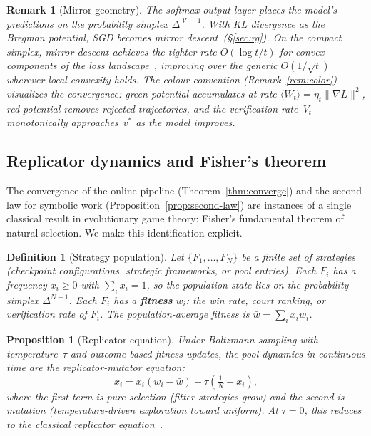 \documentclass[11pt,a4paper]{article}
\newtheorem{proposition}[theorem]{Proposition}
\newtheorem{definition}[theorem]{Definition}
\newtheorem{remark}[theorem]{Remark}
\newcommand{\cV}{\mathcal{V}}
\begin{document}
\begin{remark}[Mirror geometry]\label{rem:mirror-converge}
The softmax output layer places the model's predictions on the
probability simplex $\Delta^{|\cV|-1}$.
With KL divergence as the Bregman potential,
SGD becomes mirror descent~(\S\ref{sec:rg}).
On the compact simplex, mirror descent achieves the tighter rate
$O(\log t / t)$ for convex components of the loss
landscape~\cite{Ha16},
improving over the generic $O(1/\sqrt{t})$
wherever local convexity holds.
The colour convention (Remark~\ref{rem:color})
visualizes the convergence:
green potential accumulates at rate $\langle W_t \rangle
  = \eta_t \|\nabla L\|^2$,
red potential removes rejected trajectories,
and the verification rate~$V_t$ monotonically
approaches~$v^*$ as the model improves.
\end{remark}

\subsection{Replicator dynamics and Fisher's theorem}%
\label{sec:replicator}

The convergence of the online pipeline (Theorem~\ref{thm:converge})
and the second law for symbolic work (Proposition~\ref{prop:second-law})
are instances of a single classical result in evolutionary game
theory: Fisher's fundamental theorem of natural selection.
We make this identification explicit.

\begin{definition}[Strategy population]\label{def:strategy-pop}
Let $\{F_1, \ldots, F_N\}$ be a finite set of strategies
(checkpoint configurations, strategic frameworks, or
pool entries).
Each $F_i$ has a frequency $x_i \geq 0$ with
$\sum_i x_i = 1$, so the population state lies on the
probability simplex $\Delta^{N-1}$.
Each $F_i$ has a \textbf{fitness} $w_i$: the win rate,
court ranking, or verification rate of $F_i$.
The population-average fitness is
$\bar{w} = \sum_i x_i w_i$.
\end{definition}

\begin{proposition}[Replicator equation]\label{prop:replicator}
Under Boltzmann sampling with temperature~$\tau$ and
outcome-based fitness updates, the pool dynamics in
continuous time are the replicator-mutator equation:
\begin{equation}\label{eq:replicator}
  \dot{x}_i = x_i(w_i - \bar{w})
    + \tau\!\left(\tfrac{1}{N} - x_i\right),
\end{equation}
where the first term is pure selection
(fitter strategies grow) and the second is mutation
(temperature-driven exploration toward uniform).
At $\tau = 0$, this reduces to the classical
replicator equation~\cite{TJ78}.
\end{proposition}
\end{document}
